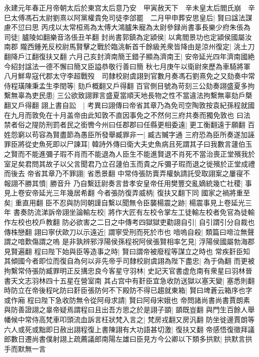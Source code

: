 永建元年春正月帝朝太后於東宫太后意乃安　甲寅赦天下　辛未皇太后閻氏崩　辛巳太傅馮石太尉劉熹以阿黨權貴免司徒李郃罷　二月甲申葬安思皇后|{
	賢曰諡法謀慮不愆曰思}
丙戌以太常桓焉為太傅大鴻臚朱寵為太尉參録尚書事長樂少府朱倀為司徒|{
	臚陵如翻樂音洛倀丑羊翻}
封尚書郭鎮為定潁侯|{
	以禽閻景功也定潁侯國屬汝南郡}
隴西鍾羌反校尉馬賢擊之戰於臨洮斬首千餘級羌衆皆降由是涼州復定|{
	洮土刀翻降戶江翻復扶又翻}
六月己亥封濟南簡王錯子顯為濟南王|{
	安帝延光四年濟南國絶今紹封諡法一德不懈曰簡又臣謚恭敬行善曰簡}
秋七月庚午以衛尉來歷為車騎將軍　八月鮮卑寇代郡太守李超戰歿　司隸校尉虞詡到官數月奏馮石劉熹免之又劾奏中常侍程璜陳秉孟生李閏等|{
	劾戶概翻又戶得翻}
百官側目號為苛刻三公劾奏詡盛夏多拘繫無辜為吏民患|{
	三公欲致詡罪言盛夏當順天地長物之性不當違法拘繫無辜劾戶槩翻又戶得翻}
詡上書自訟　|{
	考異曰詡傳曰帝省其章乃為免司空陶敦按袁紀孫程就國在九月而敦免在十月盖帝由此知敦不直因事免之不然何三府共奏而獨免敦也}
曰法禁者俗之隄防刑罰者民之銜轡今州曰任郡郡曰任縣更相委遠|{
	更工衡翻遠于願翻}
百姓怨窮以苟容為賢盡節為愚臣所發舉臧罪非一|{
	臧古贓字通}
三府恐為臣所奏遂加誣罪臣將從史魚死即以尸諫耳|{
	韓詩外傳曰衛大夫史魚病且死謂其子曰我數言蘧伯玉之賢而不能進彌子瑕不肖而不能退為人臣生不能進賢退不肖死不當治喪正堂殯我於室足矣君問其故子以父言聞君乃立召蘧伯玉而貴之斥彌子瑕而退之徙殯於正堂成禮而後去}
帝省其章乃不罪詡|{
	省悉景翻}
中常侍張防賣弄權埶請託受取詡案之屢寑不報詡不勝其憤|{
	勝音升}
乃自繫廷尉奏言昔孝安皇帝任用樊豐交亂嫡統幾亡社稷|{
	事見上卷安帝延光三年幾居希翻}
今者張防復弄威柄|{
	復扶又翻下同}
國家之禍將重至矣|{
	重直用翻}
臣不忍與防同朝謹自繫以聞無令臣襲楊震之跡|{
	楊震事見上卷延光三年}
書奏防流涕訴帝詡坐論輸左校|{
	將作大匠有左校令掌左工徒輸左校者免官為徒輸作左校也校戶教翻}
防必欲害之二日之中傳考四獄獄吏勸詡自引|{
	自引謂引分自裁也傳株戀翻}
詡曰寧伏歐刀以示遠近|{
	謂寧受刑而死於市也}
喑嗚自殺|{
	類篇曰啼泣無聲謂之喑歎傷謂之嗚}
是非孰辨邪浮陽侯孫程祝阿侯張賢相率乞見|{
	浮陽侯國屬勃海郡見賢遍翻}
程曰陛下始與臣等造事之時|{
	賢曰謂帝被廢程等謀立之時也}
常疾姧臣知其傾國今者即位而復自為何以非先帝乎司隸校尉虞詡為陛下盡忠|{
	為于偽翻}
而更被拘繫常侍張防臧罪明正反搆忠良今客星守羽林|{
	史記天官書虚危南有衆星曰羽林晉書天文志羽林四十五星在營室南}
其占宫中有姧臣宜急收防送獄以塞天變|{
	塞悉則翻}
時防立在帝後程叱防曰姧臣張防何不下殿防不得已趨就東箱|{
	賢曰埤蒼云箱序也字或作廂}
程曰陛下急收防無令從阿母求請|{
	賢曰阿母宋娥也}
帝問諸尚書尚書賈朗素與防善證詡之辠帝疑焉謂程曰且出吾方思之於是詡子顗|{
	顗既豈翻}
與門生百餘人舉幡候中常侍高梵車叩頭流血訴言枉狀梵入言之|{
	梵房戎翻又房汎翻}
防坐徙邊賈朗等六人或死或黜即日赦出詡程復上書陳詡有大功語甚切激|{
	復扶又翻}
帝感悟復徵拜議郎數日遷尚書僕射詡上疏薦議郎南陽左雄曰臣見方今公卿以下類多拱默|{
	拱默言拱手而默無一言}
